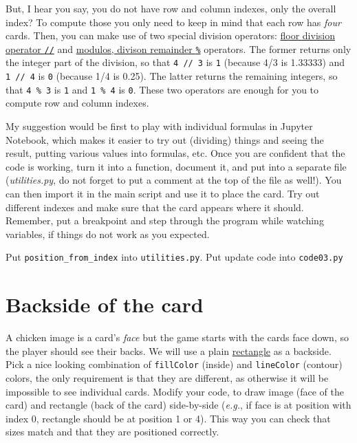 \documentclass[
]{book}
\begin{document}
But, I hear you say, you do not have row and column indexes, only the overall index? To compute those you only need to keep in mind that each row has \emph{four} cards. Then, you can make use of two special division operators: \href{https://python-reference.readthedocs.io/en/latest/docs/operators/floor_division.html}{floor division operator \texttt{//}} and \href{https://python-reference.readthedocs.io/en/latest/docs/operators/modulus.html}{modulos, divison remainder \texttt{\%}} operators. The former returns only the integer part of the division, so that \texttt{4\ //\ 3} is \texttt{1} (because 4/3 is 1.33333) and \texttt{1\ //\ 4} is \texttt{0} (because 1/4 is 0.25). The latter returns the remaining integers, so that \texttt{4\ \%\ 3} is \texttt{1} and \texttt{1\ \%\ 4} is \texttt{0}. These two operators are enough for you to compute row and column indexes.

My suggestion would be first to play with individual formulas in Jupyter Notebook, which makes it easier to try out (dividing) things and seeing the result, putting various values into formulas, etc. Once you are confident that the code is working, turn it into a function, document it, and put into a separate file (\emph{utilities.py}, do not forget to put a comment at the top of the file as well!). You can then import it in the main script and use it to place the card. Try out different indexes and make sure that the card appears where it should. Remember, put a breakpoint and step through the program while watching variables, if things do not work as you expected.

Put \texttt{position\_from\_index} into \texttt{utilities.py}.
Put update code into \texttt{code03.py}

\hypertarget{backside-of-the-card}{%
\section{Backside of the card}\label{backside-of-the-card}}

A chicken image is a card's \emph{face} but the game starts with the cards face down, so the player should see their backs. We will use a plain \href{https://psychopy.org/api/visual/rect.html}{rectangle} as a backside. Pick a nice looking combination of \texttt{fillColor} (inside) and \texttt{lineColor} (contour) colors, the only requirement is that they are different, as otherwise it will be impossible to see individual cards. Modify your code, to draw image (face of the card) and rectangle (back of the card) side-by-side (\emph{e.g.}, if face is at position with index 0, rectangle should be at position 1 or 4). This way you can check that sizes match and that they are positioned correctly.
\end{document}
